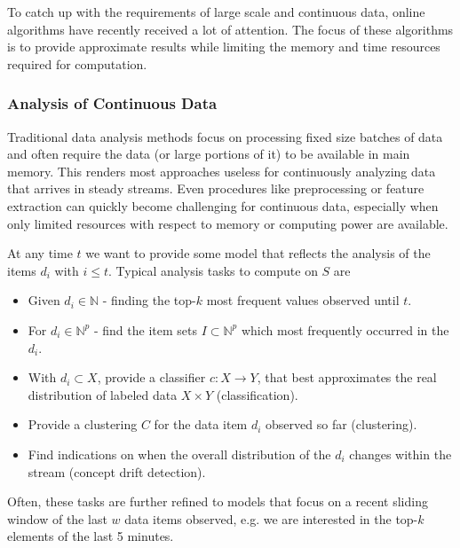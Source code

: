 To catch up with the requirements of large scale and continuous data,
online algorithms have recently received a lot of attention. The focus
of these algorithms is to provide approximate results while limiting
the memory and time resources required for computation. 


\subsubsection*{Analysis of Continuous Data}
Traditional data analysis methods focus on processing fixed size
batches of data and often require the data (or large portions of it)
to be available in main memory. This renders most approaches useless
for continuously analyzing data that arrives in steady streams. Even
procedures like preprocessing or feature extraction can quickly become
challenging for continuous data, especially when only limited
resources with respect to memory or computing power are available.

At any time $t$ we want to provide some model that reflects the
analysis of the items $d_i$ with $i\le t$.  Typical analysis tasks to
compute on $S$ are
\begin{itemize}
\item Given $d_i \in \mathbb{N}$ - finding the top-$k$ most frequent
  values observed until $t$.
\item For $d_i \in \mathbb{N}^p$ - find the item sets $I \subset
  \mathbb{N}^p$ which most frequently occurred in the $d_i$.
\item With $d_i \subset X$, provide a classifier $c:X \rightarrow Y$,
  that best approximates the real distribution of labeled data $X
  \times Y$ (classification).
\item Provide a clustering $C$ for the data item $d_i$ observed so far (clustering).
\item Find indications on when the overall distribution of the $d_i$
  changes within the stream (concept drift detection).
\end{itemize}
Often, these tasks are further refined to models that focus on a
recent sliding window of the last $w$ data items observed, e.g. we are
interested in the top-$k$ elements of the last 5 minutes. 

